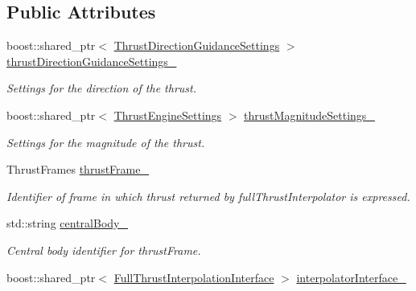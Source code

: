\subsection*{Public Attributes}
\begin{DoxyCompactItemize}
\item 
boost\+::shared\+\_\+ptr$<$ \hyperlink{classtudat_1_1simulation__setup_1_1ThrustDirectionGuidanceSettings}{Thrust\+Direction\+Guidance\+Settings} $>$ \hyperlink{classtudat_1_1simulation__setup_1_1ThrustAccelerationSettings_a4990124cce8534183db087d9aa42863a}{thrust\+Direction\+Guidance\+Settings\+\_\+}\hypertarget{classtudat_1_1simulation__setup_1_1ThrustAccelerationSettings_a4990124cce8534183db087d9aa42863a}{}\label{classtudat_1_1simulation__setup_1_1ThrustAccelerationSettings_a4990124cce8534183db087d9aa42863a}

\begin{DoxyCompactList}\small\item\em Settings for the direction of the thrust. \end{DoxyCompactList}\item 
boost\+::shared\+\_\+ptr$<$ \hyperlink{classtudat_1_1simulation__setup_1_1ThrustEngineSettings}{Thrust\+Engine\+Settings} $>$ \hyperlink{classtudat_1_1simulation__setup_1_1ThrustAccelerationSettings_af4539aa18a67b166bd5ea5362fd713fd}{thrust\+Magnitude\+Settings\+\_\+}\hypertarget{classtudat_1_1simulation__setup_1_1ThrustAccelerationSettings_af4539aa18a67b166bd5ea5362fd713fd}{}\label{classtudat_1_1simulation__setup_1_1ThrustAccelerationSettings_af4539aa18a67b166bd5ea5362fd713fd}

\begin{DoxyCompactList}\small\item\em Settings for the magnitude of the thrust. \end{DoxyCompactList}\item 
Thrust\+Frames \hyperlink{classtudat_1_1simulation__setup_1_1ThrustAccelerationSettings_a769892c0ff68a3a332aee38e5395790b}{thrust\+Frame\+\_\+}
\begin{DoxyCompactList}\small\item\em Identifier of frame in which thrust returned by full\+Thrust\+Interpolator is expressed. \end{DoxyCompactList}\item 
std\+::string \hyperlink{classtudat_1_1simulation__setup_1_1ThrustAccelerationSettings_ad5c45c7305e18e1decb708f122cb7b70}{central\+Body\+\_\+}
\begin{DoxyCompactList}\small\item\em Central body identifier for thrust\+Frame. \end{DoxyCompactList}\item 
boost\+::shared\+\_\+ptr$<$ \hyperlink{classtudat_1_1simulation__setup_1_1FullThrustInterpolationInterface}{Full\+Thrust\+Interpolation\+Interface} $>$ \hyperlink{classtudat_1_1simulation__setup_1_1ThrustAccelerationSettings_a279e108bba5fbde40e939c54278691f5}{interpolator\+Interface\+\_\+}\hypertarget{classtudat_1_1simulation__setup_1_1ThrustAccelerationSettings_a279e108bba5fbde40e939c54278691f5}{}\label{classtudat_1_1simulation__setup_1_1ThrustAccelerationSettings_a279e108bba5fbde40e939c54278691f5}


\end{DoxyCompactItemize}
